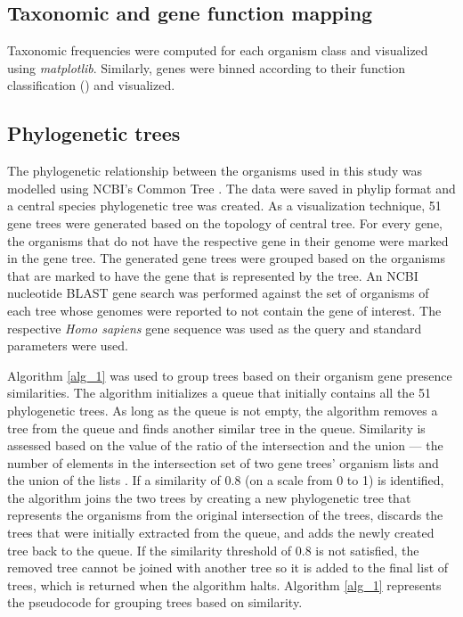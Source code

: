\documentclass{article}
\begin{document}
\subsection{Taxonomic and gene function mapping}
Taxonomic frequencies were computed for each organism class and visualized using \textit{matplotlib}. Similarly, genes were binned according to their function classification (\cite{pg_chapter}) and visualized.

\subsection{Phylogenetic trees}
The phylogenetic relationship between the organisms used in this study was modelled using NCBI's Common Tree \cite{ncbi_tax_1, ncbi_tax_2}. The data were saved in phylip format and a central species phylogenetic tree was created. As a visualization technique, 51 gene trees were generated based on the topology of central tree. For every gene, the organisms that do not have the respective gene in their genome were marked in the gene tree. The generated gene trees were grouped based on the organisms that are marked to have the gene that is represented by the tree. An NCBI nucleotide BLAST gene search was performed against the set of organisms of each tree whose genomes were reported to not contain the gene of interest. The respective \textit{Homo sapiens} gene sequence was used as the query and standard parameters were used.

Algorithm \ref{alg_1} was used to group trees based on their organism gene presence similarities. The algorithm initializes a queue that initially contains all the 51 phylogenetic trees. As long as the queue is not empty, the algorithm removes a tree from the queue and finds another similar tree in the queue. Similarity is assessed based on the value of the ratio of the intersection and the union --- the number of elements in the intersection set of two gene trees' organism lists and the union of the lists \cite{jaccard}. If a similarity of 0.8 (on a scale from 0 to 1) is identified, the algorithm joins the two trees by creating a new phylogenetic tree that represents the organisms from the original intersection of the trees, discards the trees that were initially extracted from the queue, and adds the newly created tree back to the queue. If the similarity threshold of 0.8 is not satisfied, the removed tree cannot be joined with another tree so it is added to the final list of trees, which is returned when the algorithm halts. Algorithm \ref{alg_1} represents the pseudocode for grouping trees based on similarity.
\end{document}
